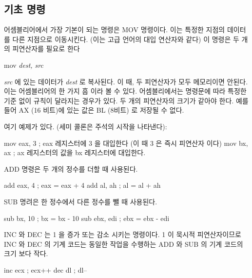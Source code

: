 \subsection{기초 명령}

어셈블리어에서 가장 기본이 되는 명령은 {\code MOV}  명령이다. 이는 특정한 지점의 데이터를 다른 지점으로 이동시킨다. (이는 고급 언어의
대입 연산자와 같다) 이 명령은 두 개의 피연산자를 필요로 한다
\begin{CodeQuote}
  mov {\em dest, src}
\end{CodeQuote}
{\em src} 에 있는 데이터가 {\em dest\/} 로 복사된다. 이 때, 두 피연산자가 모두 메모리이면 안된다. 이는 어셈블리어의 한 가지 흠
이라 볼 수 있다. 어셈블리에서는 명령문에 따라 특정한 기준 없이 규칙이 달라지는 경우가 있다. 두 개의 피연산자의 크기가 같아야 한다. 
예를 들어 AX (16 비트)에 있는 값은 BL (8비트) 로 저장될 수 없다. 

여기 예제가 있다. (세미 콜론은 주석의 시작을 나타낸다):

\begin{AsmCodeListing}[frame=none, numbers=none]
      mov    eax, 3   ; eax 레지스터에 3 을 대입한다 (이 때 3 은 즉시 피연산자 이다)
      mov    bx, ax   ; ax 레지스터의 값을 bx 레지스터에 대입한다.
\end{AsmCodeListing}

{\code ADD}  명령은 두 개의 정수를 더할 때 사용된다.

\begin{AsmCodeListing}[frame=none, numbers=none]
      add    eax, 4   ; eax = eax + 4
      add    al, ah   ; al = al + ah 
\end{AsmCodeListing}

{\code SUB}  명려은 한 정수에서 다른 정수를 뺄 때 사용된다.

\begin{AsmCodeListing}[frame=none, numbers=none]
      sub    bx, 10   ; bx = bx - 10
      sub    ebx, edi ; ebx = ebx - edi
\end{AsmCodeListing}

{\code INC}  와 {\code DEC}  는 1 을 증가 또는 감소 시키는 명령이다. 1 이 묵시적 피연산자이므로 {\code INC} 와 {\code DEC} 의
기계 코드는 동일한 작업을 수행하는 {\code ADD} 와 {\code SUB} 의 기계 코드의 크기 보다 작다. 

\begin{AsmCodeListing}[frame=none, numbers=none]
      inc    ecx      ; ecx++
      dec    dl       ; dl--
\end{AsmCodeListing}

